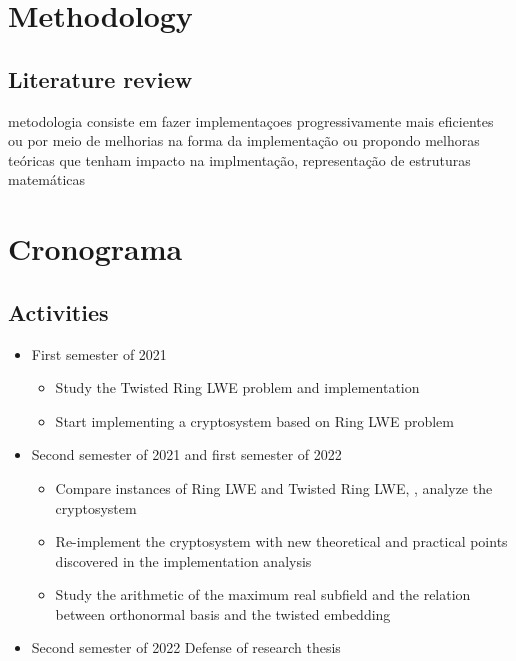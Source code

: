 \documentclass[a4paper,12pt]{article}
\begin{document}
\section{Methodology}
\label{sec:org2472da2}
\subsection{Literature review}
\label{sec:orgcdf973b}
metodologia consiste em fazer implementaçoes progressivamente mais eficientes ou por meio de melhorias na forma da implementação ou propondo melhoras teóricas que tenham impacto na implmentação, representação de estruturas matemáticas 
\section{Cronograma}
\label{sec:org962daf7}
\subsection{Activities}
\label{sec:orgdac1d34}
\begin{itemize}
\item First semester of 2021
\begin{itemize}
\item Study the Twisted Ring LWE problem and implementation
\item Start implementing a cryptosystem based on Ring LWE problem
\end{itemize}
\item Second semester of 2021 and first semester of 2022
\begin{itemize}
\item Compare instances of Ring LWE and Twisted Ring LWE, \ie, analyze the cryptosystem
\item Re-implement the cryptosystem with new theoretical and practical points discovered in the implementation analysis
\item Study the arithmetic of the maximum real subfield and the relation between orthonormal basis and the twisted embedding
\end{itemize}
\item Second semester of 2022
Defense of research thesis
\end{itemize}




\end{document}
